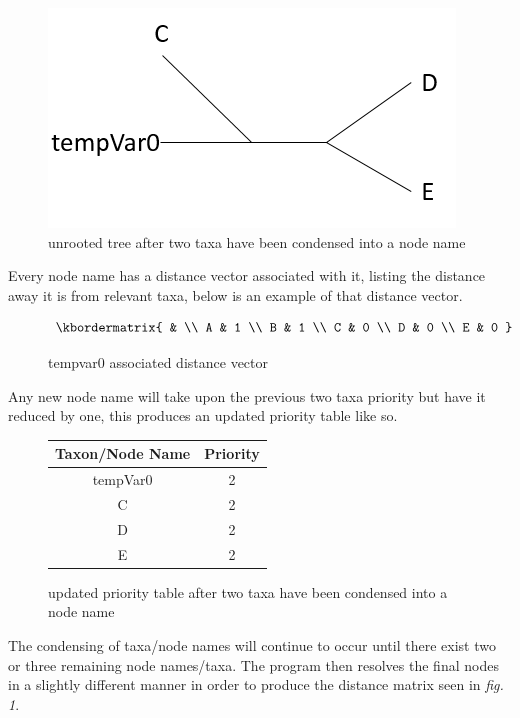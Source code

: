 \documentclass{article}
\begin{document}
\begin{figure}

\includegraphics{secondTree.PNG} 
\caption{unrooted tree after two taxa have been condensed into a node name}
\end{figure}

Every node name has a distance vector associated with it, listing the distance away it is from relevant taxa, below is an example of that distance vector. 

\begin{figure}
\[
\kbordermatrix{
	& \\
	A & 1 \\
	B & 1 \\
	C & 0 \\
	D & 0 \\
	E & 0
}
\]
\caption{tempvar0 associated distance vector}
\end{figure}

Any new node name will take upon the previous two taxa priority but have it reduced by one, this produces an updated priority table like so.

\begin{figure}
\begin{center}
	\begin{tabular}{ |c|c| } 
		\hline
		Taxon/Node Name & Priority  \\
		\hline
		tempVar0 & 2 \\ 
		\hline
		C & 2 \\
		\hline 
		D & 2 \\
		\hline 
		E & 2 \\ 
		\hline
	\end{tabular}
\end{center}
\caption{updated priority table after two taxa have been condensed into a node name}
\end{figure}

The condensing of taxa/node names will continue to occur until there exist two or three remaining node names/taxa. The program then resolves the final nodes in a slightly different manner in order to produce the distance matrix seen in \textit{fig. 1}.
\end{document}
